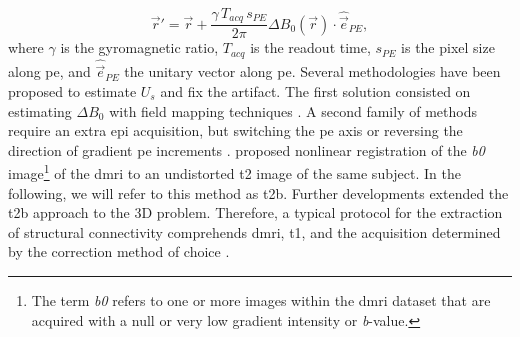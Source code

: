   \begin{equation}
  \vec{r}' = \vec{r} + \frac{\gamma \, T_{acq}\, s_{PE}}{2\pi}\Delta B_0(\vec{r}) \cdot \hat{\vec{e}}_{PE},
  \label{eq:fieldmap}
  \end{equation}
%
where $\gamma$ is the gyromagnetic ratio, $T_{acq}$ is the readout time,
  $s_{PE}$ is the pixel size along \gls*{pe}, and $\hat{\vec{e}}_{PE}$ the unitary
  vector along \gls*{pe}.
Several methodologies have been proposed to estimate $U_s$ and fix the artifact.
The first solution consisted on estimating $\Delta B_0$ with field mapping
  techniques \citep{andersson_modeling_2001}.
A second family of methods require an extra \gls*{epi} acquisition, but switching
  the \gls*{pe} axis \citep{chiou_simple_2000} or reversing the direction of gradient \gls*{pe}
  increments \citep{cordes_geometric_2000,holland_efficient_2010}.
\cite{kybic_unwarping_2000} proposed nonlinear registration of the \emph{b0}
  image\footnote{The term \emph{b0} refers to one or more images within the
  \gls*{dmri} dataset that are acquired with a null or very low gradient intensity or
   \emph{b}-value.} of the \gls*{dmri} to an undistorted \gls*{t2} image of
   the same subject.
In the following, we will refer to this method as \gls*{t2b}.
Further developments \citep{irfanoglu_susceptibility_2011} extended the \gls*{t2b} 
  approach to the 3D problem.
Therefore, a typical protocol for the extraction of structural connectivity
  comprehends \gls*{dmri}, \gls*{t1}, and the acquisition determined by the correction
  method of choice \citep{daducci_connectome_2012}.


